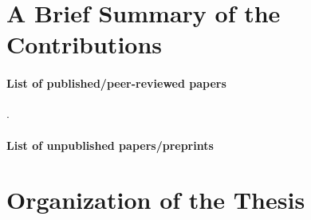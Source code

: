 \section{A Brief Summary of the Contributions}\label{sec:intro.contributions}

\paragraph{List of published/peer-reviewed papers}

\cite{shang2020t3c,shang2018adaptive,shang2019dttts,shang2019adaptive,degenne2020game,shang2020vector}.

\paragraph{List of unpublished papers/preprints}

\section{Organization of the Thesis}\label{sec:intro.organization}

% 
% 
